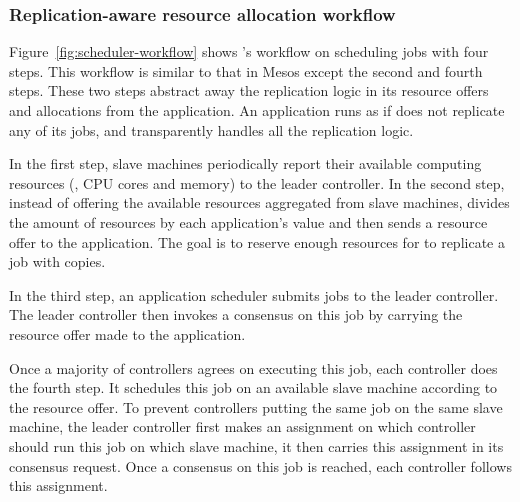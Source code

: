 \vspace{-.15in}\subsubsection{Replication-aware resource allocation workflow}
\label{sec:workflow}\vspace{-.075in}

Figure~\ref{fig:scheduler-workflow} shows \tripod's workflow on scheduling jobs 
with four steps. This workflow is similar to that in Mesos except the second 
and fourth steps. These two steps \tripod abstract away the replication logic 
in its resource offers and allocations from the application. An application runs 
as if \xxx does not replicate any of its jobs, and \tripod transparently 
handles all the replication logic.

In the first step, slave machines periodically report their available computing 
resources (\eg, CPU cores and memory) to the leader controller. In the second 
step, instead of offering the available resources aggregated from slave 
machines, \tripod divides the amount of resources by each application's  
value and then sends a resource offer to the application. The goal is to 
reserve enough resources for \tripod to replicate a job with  copies.

In the third step, an application scheduler submits jobs to the leader 
controller. The leader controller then invokes a consensus on this job by 
carrying the resource offer made to the application.

Once a majority of controllers agrees on executing this job, each controller 
does the fourth step. It schedules this job on an available slave machine 
according to the resource offer. To prevent controllers putting the same job on 
the same slave machine, the leader controller first makes an assignment on 
which controller should run this job on which slave machine, it then carries 
this assignment in its consensus request. Once a consensus on this job is 
reached, each controller follows this assignment.



